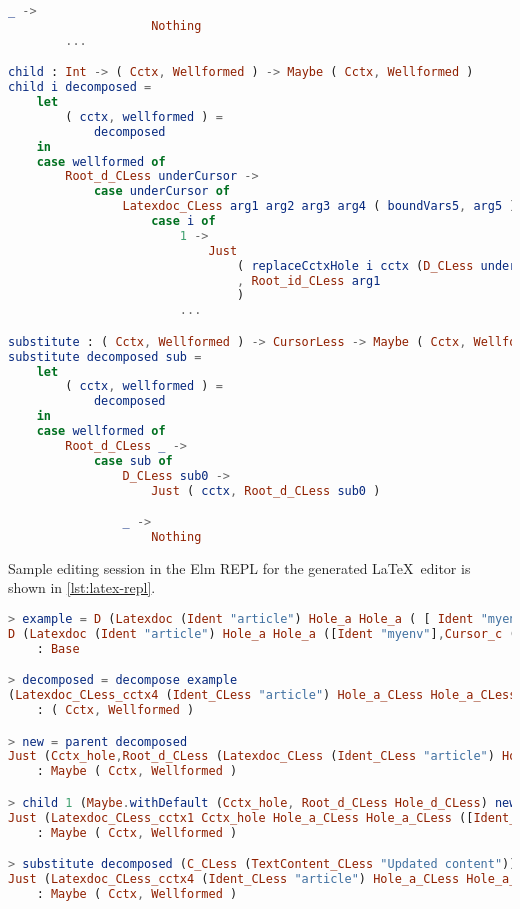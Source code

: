 \begin{lstlisting}[style=inline, language=elm, caption={Generated functions for cursor movement for the \LaTeX language}, label={lst:latex-movement}]
                _ ->
                    Nothing
        ...

child : Int -> ( Cctx, Wellformed ) -> Maybe ( Cctx, Wellformed )
child i decomposed =
    let
        ( cctx, wellformed ) =
            decomposed
    in
    case wellformed of
        Root_d_CLess underCursor ->
            case underCursor of
                Latexdoc_CLess arg1 arg2 arg3 arg4 ( boundVars5, arg5 ) ->
                    case i of
                        1 ->
                            Just
                                ( replaceCctxHole i cctx (D_CLess underCursor)
                                , Root_id_CLess arg1
                                )
                        ...

substitute : ( Cctx, Wellformed ) -> CursorLess -> Maybe ( Cctx, Wellformed )
substitute decomposed sub =
    let
        ( cctx, wellformed ) =
            decomposed
    in
    case wellformed of
        Root_d_CLess _ ->
            case sub of
                D_CLess sub0 ->
                    Just ( cctx, Root_d_CLess sub0 )

                _ ->
                    Nothing
\end{lstlisting}

Sample editing session in the Elm REPL for the generated \LaTeX \ editor is
shown in \cref{lst:latex-repl}.

\begin{lstlisting}[style=inline, language=elm, caption={Editing sessions with the \LaTeX \ editor in the Elm REPl}, label={lst:latex-repl}]
> example = D (Latexdoc (Ident "article") Hole_a Hole_a ( [ Ident "myenv" ], Cursor_c (TextContent "Hello World!") ))
D (Latexdoc (Ident "article") Hole_a Hole_a ([Ident "myenv"],Cursor_c (TextContent ("Hello World!"))))
    : Base

> decomposed = decompose example
(Latexdoc_CLess_cctx4 (Ident_CLess "article") Hole_a_CLess Hole_a_CLess ([Ident_CLess "myenv"],Cctx_hole),Root_c_CLess (TextContent_CLess ("Hello World!")))
    : ( Cctx, Wellformed )

> new = parent decomposed
Just (Cctx_hole,Root_d_CLess (Latexdoc_CLess (Ident_CLess "article") Hole_a_CLess Hole_a_CLess ([Ident_CLess "myenv"],TextContent_CLess ("Hello World!"))))
    : Maybe ( Cctx, Wellformed )

> child 1 (Maybe.withDefault (Cctx_hole, Root_d_CLess Hole_d_CLess) new)
Just (Latexdoc_CLess_cctx1 Cctx_hole Hole_a_CLess Hole_a_CLess ([Ident_CLess "myenv"],TextContent_CLess ("Hello World!")),Root_id_CLess (Ident_CLess "article"))
    : Maybe ( Cctx, Wellformed )

> substitute decomposed (C_CLess (TextContent_CLess "Updated content"))
Just (Latexdoc_CLess_cctx4 (Ident_CLess "article") Hole_a_CLess Hole_a_CLess ([Ident_CLess "myenv"],Cctx_hole),Root_c_CLess (TextContent_CLess ("Updated content")))
    : Maybe ( Cctx, Wellformed )
\end{lstlisting}